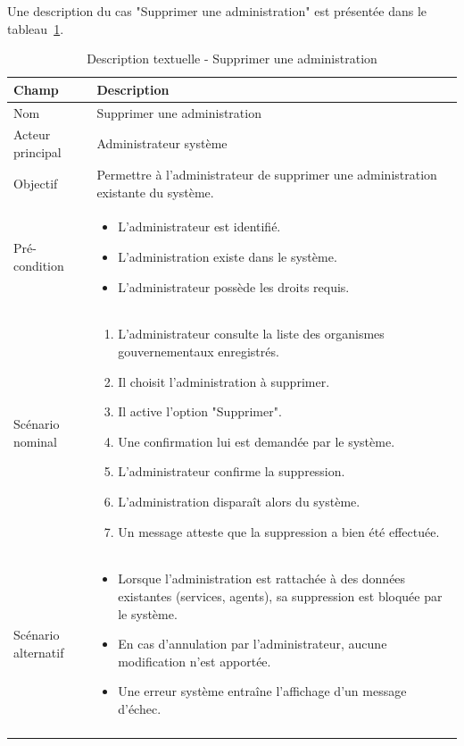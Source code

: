 Une description du cas "Supprimer une administration" est présentée dans le tableau~\ref{tab:supprimer-admin}.
\renewcommand{\arraystretch}{1.3}

\begin{longtable}{|p{4cm}|p{12cm}|}
\hline

\rowcolor{gray!20}
\textbf{Champ} & \textbf{Description} \\ \hline
\endfirsthead

 

Nom & Supprimer une administration \\ \hline

Acteur principal & Administrateur système \\ \hline

Objectif & Permettre à l’administrateur de supprimer une administration existante du système. \\ \hline

Pré-condition &
\begin{itemize}
    \item L’administrateur est identifié.
    \item L’administration existe dans le système.
    \item L'administrateur possède les droits requis.
\end{itemize}
\\ \hline

Scénario nominal &
\begin{enumerate}
    \item L'administrateur consulte la liste des organismes gouvernementaux enregistrés.
    \item Il choisit l'administration à supprimer.
    \item Il active l'option "Supprimer".
    \item Une confirmation lui est demandée par le système.
    \item L’administrateur confirme la suppression.
    \item L'administration disparaît alors du système.
    \item Un message atteste que la suppression a bien été effectuée.
\end{enumerate}
\\ \hline

Scénario alternatif &
\begin{itemize}
    \item Lorsque l'administration est rattachée à des données existantes (services, agents), sa suppression est bloquée par le système.
    \item En cas d'annulation par l'administrateur, aucune modification n'est apportée.
    \item Une erreur système entraîne l'affichage d'un message d'échec.
\end{itemize}
\\ \hline

\caption{Description textuelle - Supprimer une administration}
\label{tab:supprimer-admin}
\end{longtable}


